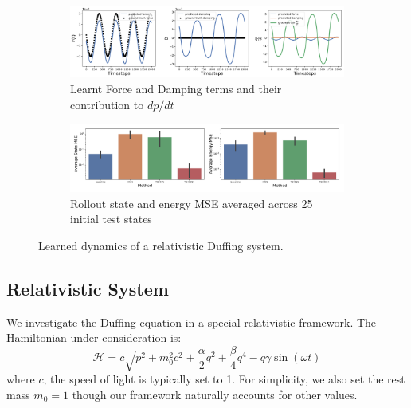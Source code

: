 \documentclass{article}
\begin{document}
\begin{figure}[h!]
\centering
\captionsetup{justification=centering}
	\begin{subfigure}[b]{0.48\textwidth}
		\centering
		\includegraphics[width=\textwidth]{figures/figures/relativity/1/relativity_dpdt_0.pdf}
		\caption{Learnt Force and Damping terms and their contribution to $dp/dt$}
	\end{subfigure}
	\begin{subfigure}[b]{0.48\textwidth}
	    \centering
		\includegraphics[width=\textwidth]{figures/figures/relativity/1/relativity_errors_0.pdf}
		\caption{Rollout state and energy MSE averaged across 25 initial test states}
	\end{subfigure}
\caption{Learned dynamics of a relativistic Duffing system.}
\end{figure}
\subsection{Relativistic System}
We investigate the Duffing equation in a special relativistic framework. The Hamiltonian under consideration is:
\begin{equation}
\mathcal{H} =  c\sqrt{p^2 +m_0^2c^2} + \frac{\alpha}{2}q^2 +\frac{\beta}{4}q^4 - q\gamma\sin(\omega t)
\end{equation}
where $c$, the speed of light is typically set to 1. For simplicity, we also set the rest mass $m_0=1$ though our framework naturally accounts for other values.
\end{document}
